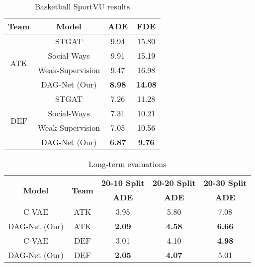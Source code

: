 \documentclass[10pt,a4paper,conference]{IEEEtran}
\begin{document}
\begin{table}[!t]
    \renewcommand{\arraystretch}{1.3}
    \centering
    \caption{Basketball SportVU results}
     \label{sportvu_results}
    \begin{tabular}{c|c|cc}
        \hline
        \textbf{Team} & \textbf{Model} & \textbf{ADE} & \textbf{FDE}\\
        \hline \hline
                \multirow{4}{*}{ATK}&STGAT \cite{stgat} & 9.94 & 15.80\\
                & Social-Ways \cite{socialways} & 9.91 & 15.19\\
                & Weak-Supervision \cite{weeksup} & 9.47 & 16.98\\
                & DAG-Net (Our) & \textbf{8.98} & \textbf{14.08}\\
        \hline
                \multirow{4}{*}{DEF}&STGAT \cite{stgat} & 7.26 & 11.28\\
                & Social-Ways \cite{socialways} & 7.31 & 10.21\\
                & Weak-Supervision \cite{weeksup} & 7.05 & 10.56\\
                & DAG-Net (Our) & \textbf{6.87} & \textbf{9.76}\\
        \hline
    \end{tabular}
\end{table}

\begin{table}[!t]
    \renewcommand{\arraystretch}{1.3}
    \centering
    \caption{Long-term evaluations}
    \label{ours_vs_cvae_long_term}
    \begin{tabular}{c|c|ccc}
        \hline
         \multirow{2}{*}{\textbf{Model}} & \multirow{2}{*}{\textbf{Team}} & \textbf{20-10 Split} & \textbf{20-20 Split} &\textbf{20-30 Split} \\
         && \textbf{ADE} &  \textbf{ADE} &  \textbf{ADE} \\
        \hline \hline
                C-VAE \cite{where_will_they_go} & ATK & 3.95 & 5.80 & 7.08 \\
                DAG-Net (Our) & ATK & \textbf{2.09} & \textbf{4.58} & \textbf{6.66} \\
        \hline
                C-VAE \cite{where_will_they_go} & DEF & 3.01 & 4.10 & \textbf{4.98} \\
                DAG-Net (Our) & DEF & \textbf{2.05} & \textbf{4.07} & 5.01 \\
        \hline
    \end{tabular}
\end{table}
\end{document}
